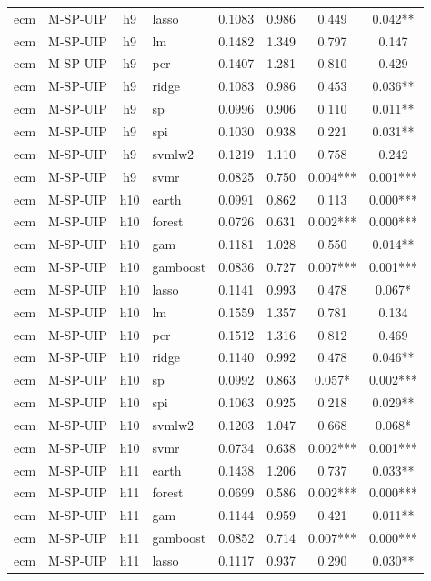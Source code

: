 \begin{ThreePartTable}
\begin{longtable}[t]{llclcccc}
ecm & M-SP-UIP & h9 & lasso & 0.1083 & 0.986 & 0.449 & 0.042**\\
ecm & M-SP-UIP & h9 & lm & 0.1482 & 1.349 & 0.797 & 0.147\\
ecm & M-SP-UIP & h9 & pcr & 0.1407 & 1.281 & 0.810 & 0.429\\
ecm & M-SP-UIP & h9 & ridge & 0.1083 & 0.986 & 0.453 & 0.036**\\
ecm & M-SP-UIP & h9 & sp & 0.0996 & 0.906 & 0.110 & 0.011**\\
ecm & M-SP-UIP & h9 & spi & 0.1030 & 0.938 & 0.221 & 0.031**\\
ecm & M-SP-UIP & h9 & svmlw2 & 0.1219 & 1.110 & 0.758 & 0.242\\
ecm & M-SP-UIP & h9 & svmr & 0.0825 & 0.750 & 0.004*** & 0.001***\\
\addlinespace
ecm & M-SP-UIP & h10 & earth & 0.0991 & 0.862 & 0.113 & 0.000***\\
ecm & M-SP-UIP & h10 & forest & 0.0726 & 0.631 & 0.002*** & 0.000***\\
ecm & M-SP-UIP & h10 & gam & 0.1181 & 1.028 & 0.550 & 0.014**\\
ecm & M-SP-UIP & h10 & gamboost & 0.0836 & 0.727 & 0.007*** & 0.001***\\
ecm & M-SP-UIP & h10 & lasso & 0.1141 & 0.993 & 0.478 & 0.067*\\
ecm & M-SP-UIP & h10 & lm & 0.1559 & 1.357 & 0.781 & 0.134\\
ecm & M-SP-UIP & h10 & pcr & 0.1512 & 1.316 & 0.812 & 0.469\\
ecm & M-SP-UIP & h10 & ridge & 0.1140 & 0.992 & 0.478 & 0.046**\\
ecm & M-SP-UIP & h10 & sp & 0.0992 & 0.863 & 0.057* & 0.002***\\
ecm & M-SP-UIP & h10 & spi & 0.1063 & 0.925 & 0.218 & 0.029**\\
ecm & M-SP-UIP & h10 & svmlw2 & 0.1203 & 1.047 & 0.668 & 0.068*\\
ecm & M-SP-UIP & h10 & svmr & 0.0734 & 0.638 & 0.002*** & 0.001***\\
\addlinespace
ecm & M-SP-UIP & h11 & earth & 0.1438 & 1.206 & 0.737 & 0.033**\\
ecm & M-SP-UIP & h11 & forest & 0.0699 & 0.586 & 0.002*** & 0.000***\\
ecm & M-SP-UIP & h11 & gam & 0.1144 & 0.959 & 0.421 & 0.011**\\
ecm & M-SP-UIP & h11 & gamboost & 0.0852 & 0.714 & 0.007*** & 0.000***\\
ecm & M-SP-UIP & h11 & lasso & 0.1117 & 0.937 & 0.290 & 0.030**\\

\end{longtable}
\end{ThreePartTable}
